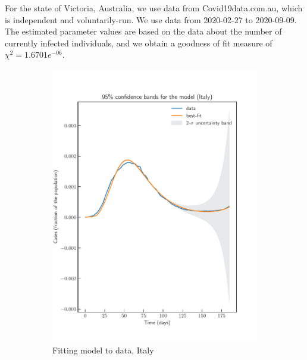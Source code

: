 \documentclass[authoryear,preprint]{elsarticle}
\begin{document}
For the state of Victoria, Australia, we use data from Covid19data.com.au, which is independent and voluntarily-run. We use data from 2020-02-27 to 2020-09-09. The estimated parameter values are based on the data about the number of currently infected individuals, and we obtain a goodness of fit measure of $\chi^2= 1.6701e^{-06}$. 
%
\begin{figure}[t!]
	\centering
	\begin{subfigure}{.5\textwidth}
		\centering
		\includegraphics[width=\linewidth]{Italy_model_confidence.pdf}
		\caption{Fitting model to data, Italy}
		\label{fig-fitness-1A}
	\end{subfigure}%
	\begin{subfigure}{.5\textwidth}
		\centering

\end{subfigure}
\end{figure}
\end{document}
